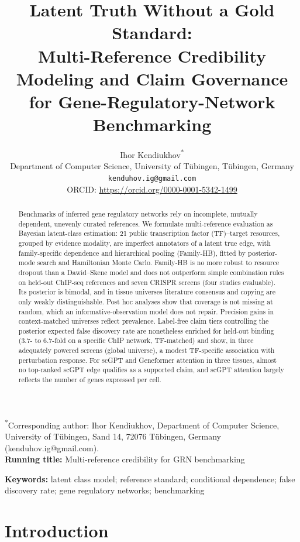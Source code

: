 \documentclass[11pt,a4paper]{article}
\title{%
  Latent Truth Without a Gold Standard:\\
  Multi-Reference Credibility Modeling and Claim Governance\\
  for Gene-Regulatory-Network Benchmarking%
}
\author{%
  Ihor Kendiukhov\textsuperscript{*}\\[4pt]
  {\normalsize Department of Computer Science, University of T\"ubingen, T\"ubingen, Germany}\\[2pt]
  {\normalsize \texttt{kenduhov.ig@gmail.com}}\\[2pt]
  {\small ORCID: \url{https://orcid.org/0000-0001-5342-1499}}
}
\date{}
\begin{document}
\linenumbers
\maketitle
\noindent\textsuperscript{*}Corresponding author: Ihor Kendiukhov, Department of Computer Science, University of T\"ubingen, Sand 14, 72076 T\"ubingen, Germany (kenduhov.ig@gmail.com).\\
\noindent\textbf{Running title:} Multi-reference credibility for GRN benchmarking

\begin{abstract}
Benchmarks of inferred gene regulatory networks rely on incomplete, mutually dependent, unevenly curated references.
We formulate multi-reference evaluation as Bayesian latent-class estimation: 21 public transcription factor (TF)--target resources, grouped by evidence modality, are imperfect annotators of a latent true edge, with family-specific dependence and hierarchical pooling (Family-HB), fitted by posterior-mode search and Hamiltonian Monte Carlo.
Family-HB is no more robust to resource dropout than a Dawid--Skene model and does not outperform simple combination rules on held-out ChIP-seq references and seven CRISPR screens (four studies evaluable).
Its posterior is bimodal, and in tissue universes literature consensus and copying are only weakly distinguishable.
Post hoc analyses show that coverage is not missing at random, which an informative-observation model does not repair.
Precision gains in context-matched universes reflect prevalence.
Label-free claim tiers controlling the posterior expected false discovery rate are nonetheless enriched for held-out binding (3.7- to 6.7-fold on a specific ChIP network, TF-matched) and show, in three adequately powered screens (global universe), a modest TF-specific association with perturbation response.
For scGPT and Geneformer attention in three tissues, almost no top-ranked scGPT edge qualifies as a supported claim, and scGPT attention largely reflects the number of genes expressed per cell.
\end{abstract}

\noindent\textbf{Keywords:} latent class model; reference standard; conditional dependence; false discovery rate; gene regulatory networks; benchmarking

\section{Introduction}\label{sec:intro}
\end{document}
